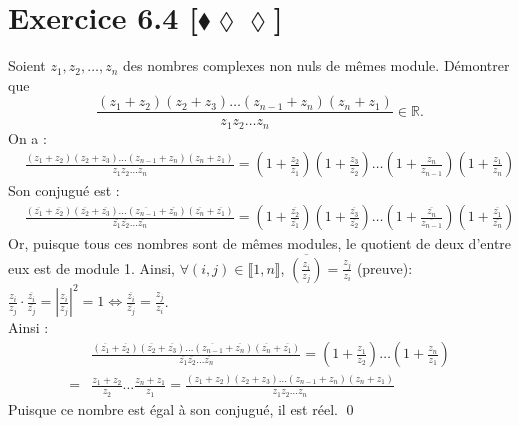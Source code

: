 \documentclass[10pt]{article}
\begin{document}

\section*{Exercice 6.4 [$\blacklozenge\lozenge\lozenge$]}
\begin{tcolorbox}[enhanced, width=7in, center, size=fbox, fontupper=\large, drop shadow southwest]
    Soient $z_1,z_2,\dots,z_n$ des nombres complexes non nuls de mêmes module. Démontrer que
    \begin{equation*}
        \frac{(z_1 + z_2)(z_2 + z_3)\dots(z_{n-1}+z_n)(z_n + z_1)}{z_1z_2\dots z_n} \in \mathbb{R}.
    \end{equation*}
    On a :
    \begin{align*}
        &\frac{(z_1 + z_2)(z_2 + z_3)\dots(z_{n-1}+z_n)(z_n + z_1)}{z_1z_2\dots z_n}=(1+\frac{z_2}{z_1})(1+\frac{z_3}{z_2})\dots(1+\frac{z_n}{z_{n-1}})(1+\frac{z_1}{z_n})
    \end{align*}
    Son conjugué est :
    \begin{align*}
        &\frac{(\overline{z_1} + \overline{z_2})(\overline{z_2} + \overline{z_3})\dots(\overline{z_{n-1}}+\overline{z_n})(\overline{z_n} + \overline{z_1})}{\overline{z_1}\overline{z_2}\dots\overline{z_n}}=(1+\frac{\overline{z_2}}{\overline{z_1}})(1+\frac{\overline{z_3}}{\overline{z_2}})\dots(1+\frac{\overline{z_n}}{\overline{z_{n-1}}})(1+\frac{\overline{z_1}}{\overline{z_n}})
    \end{align*}
    Or, puisque tous ces nombres sont de mêmes modules, le quotient de deux d'entre eux est de module 1. Ainsi, $\forall{(i,j)\in\llbracket1,n\rrbracket}$, $\overline{\left(\frac{z_i}{z_j}\right)}=\frac{z_j}{z_i}$ (preuve): $\frac{z_i}{z_j}\cdot\frac{\overline{z_i}}{\overline{z_j}}=|\frac{z_i}{z_j}|^2=1\iff\frac{\overline{z_i}}{\overline{z_j}}=\frac{z_j}{z_i}$.\\
    Ainsi :
    \begin{align*}
        &\frac{(\overline{z_1} + \overline{z_2})(\overline{z_2} + \overline{z_3})\dots(\overline{z_{n-1}}+\overline{z_n})(\overline{z_n} + \overline{z_1})}{\overline{z_1}\overline{z_2}\dots\overline{z_n}}=(1+\frac{z_1}{z_2})\dots(1+\frac{z_n}{z_1})\\
        =&\frac{z_1+z_2}{z_2}\dots\frac{z_n+z_1}{z_1}=\frac{(z_1+z_2)(z_2+z_3)\dots(z_{n-1}+z_n)(z_n+z_1)}{z_1z_2\dots z_n}
    \end{align*}
    Puisque ce nombre est égal à son conjugué, il est réel.
    \qed
\end{tcolorbox}

\end{document}
